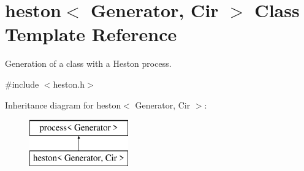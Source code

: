 \hypertarget{classheston}{}\section{heston$<$ Generator, Cir $>$ Class Template Reference}
\label{classheston}


Generation of a class with a Heston process.  




{\ttfamily \#include $<$heston.\+h$>$}

Inheritance diagram for heston$<$ Generator, Cir $>$\+:\begin{figure}[H]
\begin{center}
\leavevmode
\includegraphics[height=2.000000cm]{classheston}
\end{center}
\end{figure}
